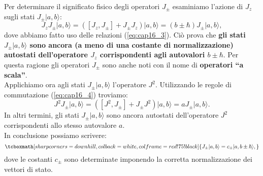 Per determinare il significato fisico degli operatori $J_{\pm}$ esaminiamo l'azione di $J_z$ sugli stati $J_{\pm} \vert a, b \rangle$:
\begin{equation}
J_zJ_{\pm} \vert a, b \rangle =\left( [J_z,J_{\pm}] + J_{\pm}J_{z}\right)\vert a, b \rangle = (b \pm \hbar )J_{\pm} \vert a, b \rangle , 
\end{equation}
dove abbiamo fatto uso delle relazioni (\ref{eq:cap16_3}). Ciò prova che \textbf{gli stati $ J_{\pm} \vert a, b \rangle$ sono ancora (a meno di una costante di normalizzazione) autostati dell'operatore $J_z$ corrispondenti agli autovalori $b\pm \hbar$}. Per questa ragione gli operatori $J_{\pm}$ sono anche noti con il nome di \textbf{operatori ``a scala''}.\\

Applichiamo ora agli stati $ J_{\pm} \vert a, b \rangle$ l'operatore $J^2$. Utilizzando le regole di commutazione (\ref{eq:cap16_4}) troviamo:
	\begin{equation}
		J^2J_{\pm} \vert a, b \rangle = \left( [J^2,J_{\pm}] + J_{\pm}J^2\right)\vert a, b \rangle = a J_{\pm} \vert a, b \rangle .
	\end{equation}
In altri termini, gli stati $J_{\pm} \vert a, b \rangle$ sono ancora autostati dell'operatore $J^2$ corrispondenti allo stesso autovalore $a$.\\

In conclusione possiamo scrivere:
	\begin{equation}
		\tcboxmath[sharp corners=downhill, colback=white, colframe=red!75!black]{
			J_{\pm} \vert a, b \rangle = c_{\pm}\vert a, b\pm \hbar \rangle,
			}
	\label{eq:cap16_5}
	\end{equation}
dove le costanti $c_{\pm}$ sono determinate imponendo la corretta normalizzazione dei vettori di stato.\\

